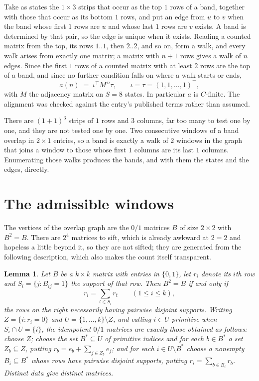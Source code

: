 \documentclass[11pt,a4paper]{article}
\theoremstyle{plain}
\newtheorem{lemma}[theorem]{Lemma}
\theoremstyle{definition}
\begin{document}
Take as states the $1\times3$ strips that occur as the top $1$ rows of a band,
together with those that occur as its bottom $1$ rows, and put an edge from $u$ to $v$
when the band whose first $1$ rows are $u$ and whose last $1$ rows are $v$ exists.
A band is determined by that pair, so the edge is unique when it exists. Reading a counted
matrix from the top, its rows $1..1$, then $2..2$, and so on, form a walk, and every
walk arises from exactly one matrix; a matrix with $n+1$ rows gives a walk of $n$ edges.
Since the first $1$ rows of a counted matrix with at least $2$ rows are the top of a
band, and since no further condition falls on where a walk starts or ends,
\[
a(n)\;=\;\iota^{\!\top}M^{\,n}\tau ,\qquad \iota=\tau=(1,1,\dots,1)^{\!\top},
\]
with $M$ the adjacency matrix on $S=8$ states. In particular $a$ is $C$-finite. The
alignment was checked against the entry's published terms rather than assumed.

There are $(1 + 1)^{3}$ strips of $1$ rows and $3$ columns, far too
many to test one by one, and they are not tested one by one. Two consecutive windows of a band
overlap in $2\times1$ entries, so a band is exactly a walk of $2$ windows in
the graph that joins a window to those whose first $1$ columns are its last $1$
columns. Enumerating those walks produces the bands, and with them the states and the edges,
directly.

\section{The admissible windows}

The vertices of the overlap graph are the $0/1$ matrices $B$ of size $2\times2$ with
$B^2=B$. There are $2^{4}$ matrices to sift, which is already awkward at $2=2$ and
hopeless a little beyond it, so they are not sifted; they are generated from the following
description, which also makes the count itself transparent.

\begin{lemma}\label{lem:idem}
Let $B$ be a $k\times k$ matrix with entries in $\{0,1\}$, let $r_i$ denote its $i$th row and
$S_i=\{j:B_{ij}=1\}$ the support of that row. Then $B^2=B$ if and only if
\[
r_i=\sum_{t\in S_i}r_t \qquad (1\le i\le k),
\]
the rows on the right necessarily having pairwise disjoint supports. Writing
$Z=\{i:r_i=0\}$ and $U=\{1,\dots,k\}\setminus Z$, and calling $i\in U$ \emph{primitive}
when $S_i\cap U=\{i\}$, the idempotent $0/1$ matrices are exactly those obtained as follows:
choose $Z$; choose the set $B^{\ast}\subseteq U$ of primitive indices and for each
$b\in B^{\ast}$ a set $Z_b\subseteq Z$, putting $r_b=e_b+\sum_{j\in Z_b}e_j$; and for each
$i\in U\setminus B^{\ast}$ choose a nonempty $B_i\subseteq B^{\ast}$ whose rows have
pairwise disjoint supports, putting $r_i=\sum_{b\in B_i}r_b$. Distinct data give distinct
matrices.
\end{lemma}
\end{document}
